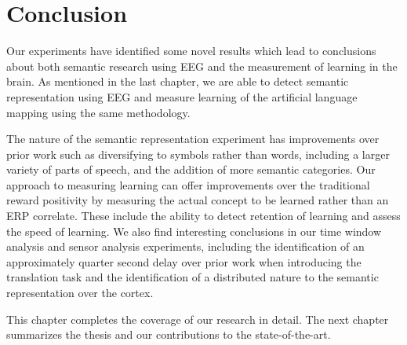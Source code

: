 \section{Conclusion}

Our experiments have identified some novel results which lead to conclusions 
about both semantic research using EEG and the measurement of learning in the 
brain. As mentioned in the last chapter, we are able to detect semantic 
representation using EEG and measure learning of the artificial language 
mapping using the same methodology. 

The nature of the semantic representation experiment has improvements over 
prior work such as diversifying to symbols rather than words, including a 
larger variety of parts of speech, and the addition of more semantic 
categories. Our approach to measuring learning can offer improvements over the 
traditional reward positivity by measuring the actual concept to be learned 
rather than an ERP correlate. These include the ability to detect retention of 
learning and assess the speed of learning. We also find interesting conclusions 
in our time window analysis and sensor analysis experiments, including the 
identification of an approximately quarter second delay over prior work when 
introducing the translation task and the identification of a distributed nature 
to the semantic representation over the cortex. 

This chapter completes the coverage of our research in detail. The next chapter 
summarizes the thesis and our contributions to the state-of-the-art.
